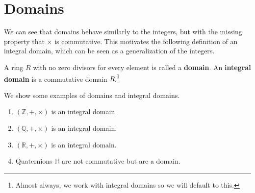\section{Domains}

  We can see that domains behave similarly to the integers, but with the missing property that $\times$ is commutative. This motivates the following definition of an integral domain, which can be seen as a generalization of the integers. 

  \begin{definition}
    \label{def:domain-integral-domain}
    A ring $R$ with no zero divisors for every element is called a \textbf{domain}. An \textbf{integral domain} is a commutative domain $R$.\footnote{Almost always, we work with integral domains so we will default to this.} 
  \end{definition} 

  \begin{example}
    \label{ex:domains-vs-integral-domains}
    We show some examples of domains and integral domains. 
    \begin{enumerate}
      \item $(\mathbb{Z}, +, \times)$ is an integral domain
      \item $(\mathbb{Q}, +, \times)$ is an integral domain. 
      \item $(\mathbb{R}, +, \times)$ is an integral domain. 
      \item Quaternions $\mathbb{H}$ are not commutative but are a domain. 
    \end{enumerate}
  \end{example} 

